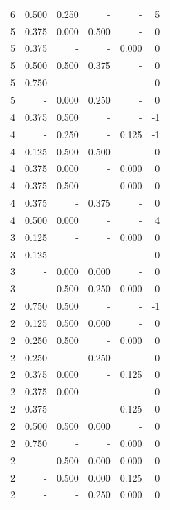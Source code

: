 \documentclass[a4paper]{article}\usepackage[]{graphicx}\usepackage[]{color}
\begin{document}
\begin{table}[ht]
\begin{tabular}{rrrrrr}
  6 & 0.500 & 0.250 & - & - & 5 \\ 
   \rowcolor{badColor} 5 & 0.375 & 0.000 & 0.500 & - & 0 \\ 
   \rowcolor{nullColor} 5 & 0.375 & - & - & 0.000 & 0 \\ 
  5 & 0.500 & 0.500 & 0.375 & - & 0 \\ 
   \rowcolor{nullColor} 5 & 0.750 & - & - & - & 0 \\ 
   \rowcolor{badColor} 5 & - & 0.000 & 0.250 & - & 0 \\ 
  4 & 0.375 & 0.500 & - & - & -1 \\ 
  4 & - & 0.250 & - & 0.125 & -1 \\ 
   \rowcolor{goodColor} 4 & 0.125 & 0.500 & 0.500 & - & 0 \\ 
  4 & 0.375 & 0.000 & - & 0.000 & 0 \\ 
  4 & 0.375 & 0.500 & - & 0.000 & 0 \\ 
   \rowcolor{sosoColor} 4 & 0.375 & - & 0.375 & - & 0 \\ 
  4 & 0.500 & 0.000 & - & - & 4 \\ 
   \rowcolor{nullColor} 3 & 0.125 & - & - & 0.000 & 0 \\ 
   \rowcolor{nullColor} 3 & 0.125 & - & - & - & 0 \\ 
   \rowcolor{goodColor} 3 & - & 0.000 & 0.000 & - & 0 \\ 
   \rowcolor{badColor} 3 & - & 0.500 & 0.250 & 0.000 & 0 \\ 
  2 & 0.750 & 0.500 & - & - & -1 \\ 
   \rowcolor{badColor} 2 & 0.125 & 0.500 & 0.000 & - & 0 \\ 
  2 & 0.250 & 0.500 & - & 0.000 & 0 \\ 
   \rowcolor{sosoColor} 2 & 0.250 & - & 0.250 & - & 0 \\ 
  2 & 0.375 & 0.000 & - & 0.125 & 0 \\ 
  2 & 0.375 & 0.000 & - & - & 0 \\ 
   \rowcolor{nullColor} 2 & 0.375 & - & - & 0.125 & 0 \\ 
   \rowcolor{badColor} 2 & 0.500 & 0.500 & 0.000 & - & 0 \\ 
   \rowcolor{nullColor} 2 & 0.750 & - & - & 0.000 & 0 \\ 
   \rowcolor{badColor} 2 & - & 0.500 & 0.000 & 0.000 & 0 \\ 
   \rowcolor{badColor} 2 & - & 0.500 & 0.000 & 0.125 & 0 \\ 
   \rowcolor{sosoColor} 2 & - & - & 0.250 & 0.000 & 0 \\ 

\end{tabular}
\end{table}
\end{document}
